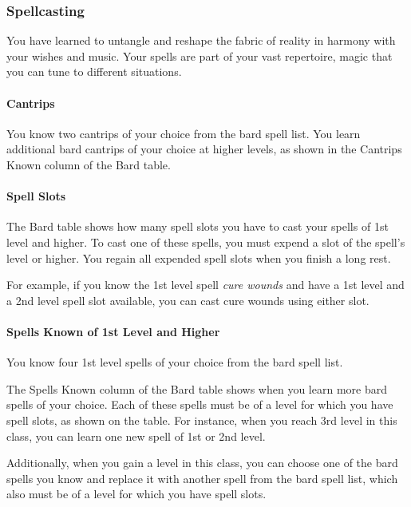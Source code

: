 \hypertarget{spellcasting}{%
\subsubsection{Spellcasting}\label{spellcasting}}

You have learned to untangle and reshape the fabric of reality in
harmony with your wishes and music. Your spells are part of your vast
repertoire, magic that you can tune to different situations.

\hypertarget{cantrips}{%
\paragraph{Cantrips}\label{cantrips}}

You know two cantrips of your choice from the bard spell list. You learn
additional bard cantrips of your choice at higher levels, as shown in
the Cantrips Known column of the Bard table.

\hypertarget{spell-slots}{%
\paragraph{Spell Slots}\label{spell-slots}}

The Bard table shows how many spell slots you have to cast your spells
of 1st level and higher. To cast one of these spells, you must expend a
slot of the spell's level or higher. You regain all expended spell slots
when you finish a long rest.

For example, if you know the 1st level spell \emph{cure wounds} and have
a 1st level and a 2nd level spell slot available, you can cast cure
wounds using either slot.

\hypertarget{spells-known-of-1st-level-and-higher}{%
\paragraph{Spells Known of 1st Level and
Higher}\label{spells-known-of-1st-level-and-higher}}

You know four 1st level spells of your choice from the bard spell list.

The Spells Known column of the Bard table shows when you learn more bard
spells of your choice. Each of these spells must be of a level for which
you have spell slots, as shown on the table. For instance, when you
reach 3rd level in this class, you can learn one new spell of 1st or 2nd
level.

Additionally, when you gain a level in this class, you can choose one of
the bard spells you know and replace it with another spell from the bard
spell list, which also must be of a level for which you have spell
slots.

